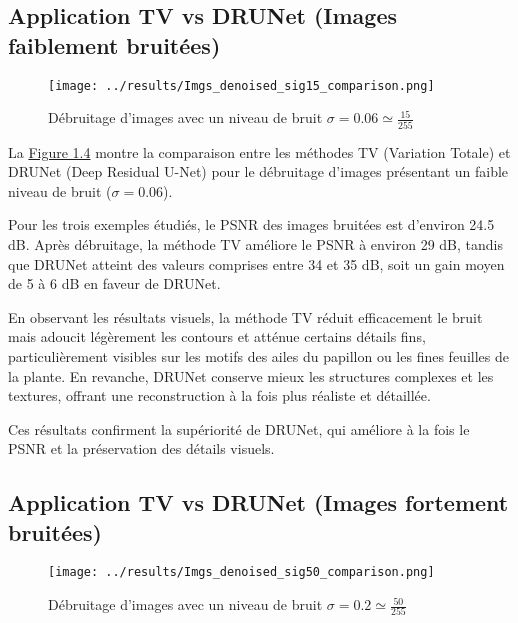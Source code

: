\documentclass[a4paper, 12pt]{report} %
\begin{document}
\subsection{Application TV vs DRUNet (Images faiblement bruitées)}
\begin{figure}[H]
\centering
\begin{adjustbox}{width=0.985\linewidth, totalheight=0.47 \textheight, angle=0, scale= 0.9, minipage= 4.2\linewidth, margin= 0}
\texttt{[image: ../results/Imgs\_denoised\_sig15\_comparison.png]}
\end{adjustbox}
\caption{Débruitage d'images avec un niveau de bruit $\sigma = 0.06 \simeq \frac{15}{255}$} 
    
    \label{fig:4}
\end{figure}   

La \hyperref[fig:4]{Figure 1.4} montre la comparaison entre les méthodes TV (Variation Totale) et DRUNet (Deep Residual U-Net) pour le débruitage d’images présentant un faible niveau de bruit (\(\sigma=0.06\)).

Pour les trois exemples étudiés, le PSNR des images bruitées est d’environ 24.5 dB. Après débruitage, la méthode TV améliore le PSNR à environ 29 dB, tandis que DRUNet atteint des valeurs comprises entre 34 et 35 dB, soit un gain moyen de 5 à 6 dB en faveur de DRUNet.

En observant les résultats visuels, la méthode TV réduit efficacement le bruit mais adoucit légèrement les contours et atténue certains détails fins, particulièrement visibles sur les motifs des ailes du papillon ou les fines feuilles de la plante. En revanche, DRUNet conserve mieux les structures complexes et les textures, offrant une reconstruction à la fois plus réaliste et détaillée. 

Ces résultats confirment la supériorité de DRUNet, qui améliore à la fois le PSNR et la préservation des détails visuels. 


\subsection{Application TV vs DRUNet (Images fortement bruitées)}
\begin{figure}[H]
\centering
\begin{adjustbox}{width=0.985\linewidth, totalheight=0.47 \textheight, angle=0, scale= 0.9, minipage= 4.2\linewidth, margin= 0}
\texttt{[image: ../results/Imgs\_denoised\_sig50\_comparison.png]}
\end{adjustbox}
    \caption{Débruitage d'images avec un niveau de bruit
    $\sigma = 0.2 \simeq \frac{50}{255}$}
    \label{fig:5}
\end{figure}
\end{document}

